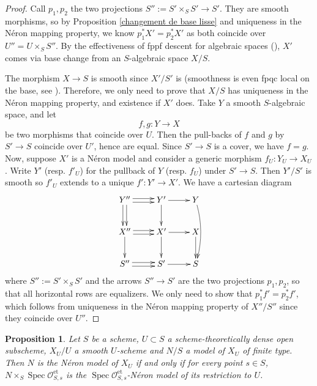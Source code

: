 \documentclass[a4paper,12pt]{amsart} %
\numberwithin{equation}{subsection}
\newcommand{\on}[1]{\operatorname{#1}}
\newcommand{\Spec}{\operatorname{Spec}}
\theoremstyle{definition}
\theoremstyle{plain}%
\newtheorem{proposition}[definition]{Proposition}
\theoremstyle{remark}
\renewcommand{\O}{\mathcal{O}}
\begin{document}
\begin{proof}
Call $p_1,p_2$ the two projections $S'':=S'\times_S S'\to S'$. They are smooth morphisms, so by Proposition \ref{changement de base lisse} and uniqueness in the Néron mapping property, we know $p_1^*X'=p_2^*X'$ as both coincide over $U''=U\times_S S''$. By the effectiveness of fppf descent for algebraic spaces (\cite[\href{https://stacks.math.columbia.edu/tag/0ADV}{Tag 0ADV}]{stacks-project}), $X'$ comes via base change from an $S$-algebraic space $X/S$.

The morphism $X\to S$ is smooth since $X'/S'$ is (smoothness is even fpqc local on the base, see \cite[\href{http://stacks.math.columbia.edu/tag/02VL}{Tag 02VL}]{stacks-project}). Therefore, we only need to prove that $X/S$ has uniqueness in the Néron mapping property, and existence if $X'$ does. Take $Y$ a smooth $S$-algebraic space, and let
\[
f,g\colon Y \longrightarrow X
\]
be two morphisms that coincide over $U$. Then the pull-backs of $f$ and $g$ by $S' \to S$ coincide over $U'$, hence are equal. Since $S' \to S$ is a cover, we have $f=g$.
Now, suppose $X'$ is a Néron model and consider a generic morphism $f_U\colon Y_U\to X_U$. Write $Y'$ (resp. $f'_U$) for the pullback of $Y$ (resp. $f_U$) under $S'\to S$. Then $Y'/S'$ is smooth so $f'_U$ extends to a unique $f'\colon Y'\to X'$. We have a cartesian diagram
\[
\xymatrix{
Y''\ar@<-.5ex>[d] \ar@<.5ex>[d] \ar@<-.5ex>[r] \ar@<.5ex>[r] &Y'\ar[d]\ar[r] &Y\ar@/^/[dd]\\
X''\ar[d] \ar@<-.5ex>[r] \ar@<.5ex>[r] &X'\ar[d]\ar[r] &X\ar[d]\\
S''\ar@<-.5ex>[r] \ar@<.5ex>[r] &S'\ar[r] &S
}
\]
where $S'':=S'\times_S S'$ and the arrows $S''\to S'$ are the two projections $p_1,p_2$, so that all horizontal rows are equalizers. We only need to show that $p_1^*f'=p_2^*f'$, which follows from uniqueness in the N\'eron mapping property of $X''/S''$ since they coincide over $U''$.
\end{proof}



\begin{proposition}\label{proposition on peut check qu'on est un NM sur les germes etales}
Let $S$ be a scheme, $U\subset S$ a scheme-theoretically dense open subscheme, $X_U/U$ a smooth $U$-scheme and $N/S$ a model of $X_U$ of finite type. Then $N$ is the N\'eron model of $X_U$ if and only if for every point $s\in S$, $N\times_S\Spec\O_{S,s}^{\on{et}}$ is the $\Spec\O_{S,s}^{\on{et}}$-N\'eron model of its restriction to $U$.
\end{proposition}
\end{document}
